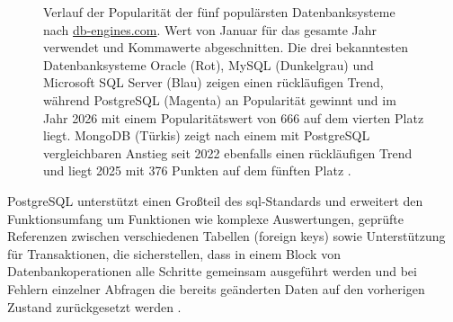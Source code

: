 \begin{figure}[htbp]
    \caption[Verlauf der Popularität der fünf populärsten Datenbanksysteme nach \href{https://db-engines.com/de/ranking_trend}{db-engines.com}]{Verlauf der Popularität der fünf populärsten Datenbanksysteme nach \href{https://db-engines.com/de/ranking_trend}{db-engines.com}. Wert von Januar für das gesamte Jahr verwendet und Kommawerte abgeschnitten.
    Die drei bekanntesten Datenbanksysteme Oracle (Rot), MySQL (Dunkelgrau) und Microsoft SQL Server (Blau) zeigen einen rückläufigen Trend, während PostgreSQL (Magenta) an Popularität gewinnt und im Jahr 2026 mit einem Popularitätswert von 666 auf dem vierten Platz liegt. MongoDB (Türkis) zeigt nach einem mit PostgreSQL vergleichbaren Anstieg seit 2022 ebenfalls einen rückläufigen Trend und liegt 2025 mit 376 Punkten auf dem fünften Platz \cite{dbengines2026rankingtrend}.}
    \label{fig:102_database-usage}
\end{figure}

PostgreSQL unterstützt einen Großteil des \gls{sql}-Standards und erweitert den Funktionsumfang um Funktionen wie komplexe Auswertungen, 
geprüfte Referenzen zwischen verschiedenen Tabellen (foreign keys) sowie Unterstützung für Transaktionen, die sicherstellen, 
dass in einem Block von Datenbankoperationen alle Schritte gemeinsam ausgeführt werden und 
bei Fehlern einzelner Abfragen die bereits geänderten Daten auf den vorherigen Zustand zurückgesetzt werden \cite{postgresqlUnknownDocs}. \\

